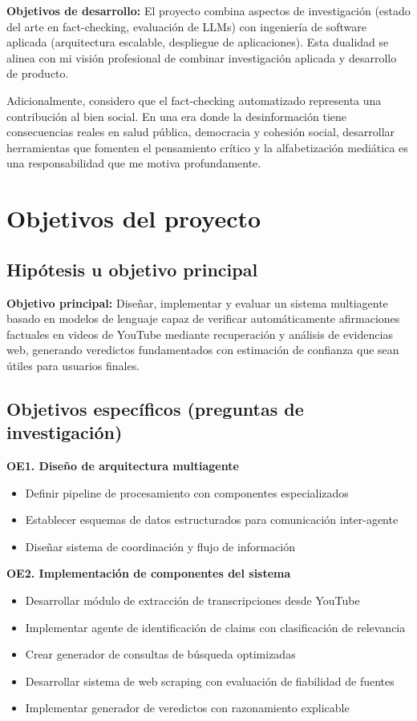 \documentclass[12pt,a4paper]{article}
\begin{document}
\textbf{Objetivos de desarrollo:} El proyecto combina aspectos de investigación (estado del arte en fact-checking, evaluación de LLMs) con ingeniería de software aplicada (arquitectura escalable, despliegue de aplicaciones). Esta dualidad se alinea con mi visión profesional de combinar investigación aplicada y desarrollo de producto.

Adicionalmente, considero que el fact-checking automatizado representa una contribución al bien social. En una era donde la desinformación tiene consecuencias reales en salud pública, democracia y cohesión social, desarrollar herramientas que fomenten el pensamiento crítico y la alfabetización mediática es una responsabilidad que me motiva profundamente.

\section{Objetivos del proyecto}

\subsection{Hipótesis u objetivo principal}

\textbf{Objetivo principal:} Diseñar, implementar y evaluar un sistema multiagente basado en modelos de lenguaje capaz de verificar automáticamente afirmaciones factuales en videos de YouTube mediante recuperación y análisis de evidencias web, generando veredictos fundamentados con estimación de confianza que sean útiles para usuarios finales.

\subsection{Objetivos específicos (preguntas de investigación)}

\textbf{OE1. Diseño de arquitectura multiagente}
\begin{itemize}
    \item Definir pipeline de procesamiento con componentes especializados
    \item Establecer esquemas de datos estructurados para comunicación inter-agente
    \item Diseñar sistema de coordinación y flujo de información
\end{itemize}

\textbf{OE2. Implementación de componentes del sistema}
\begin{itemize}
    \item Desarrollar módulo de extracción de transcripciones desde YouTube
    \item Implementar agente de identificación de claims con clasificación de relevancia
    \item Crear generador de consultas de búsqueda optimizadas
    \item Desarrollar sistema de web scraping con evaluación de fiabilidad de fuentes
    \item Implementar generador de veredictos con razonamiento explicable
\end{itemize}
\end{document}
